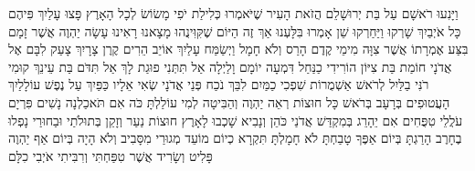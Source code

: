 \documentclass[../main/main.tex]{subfiles}
\begin{document}
\begin{multicols*}{\ncols}
וַיָּנִעוּ רֹאשָׁם עַל בַּת יְרוּשָׁלֵם הֲזֹאת הָעִיר שֶׁיֹּאמְרוּ כְּלִילַת יֹפִי מָשׂוֹשׂ לְכָל הָאָרֶץ \ClosedSection{}פָּצוּ עָלַיִךְ פִּיהֶם כָּל אֹיְבַיִךְ שָׁרְקוּ וַיַּחַרְקוּ שֵׁן אָמְרוּ בִּלָּעְנוּ אַךְ זֶה הַיּוֹם שֶׁקִּוִּינֻהוּ מָצָאנוּ רָאִינוּ \ClosedSection{}עָשָׂה יַהְוֶה אֲשֶׁר זָמָם בִּצַּע אֶמְרָתוֹ אֲשֶׁר צִוָּה מִימֵי קֶדֶם הָרַס וְלֹא חָמָל וַיְשַׂמַּח עָלַיִךְ אוֹיֵב הֵרִים קֶרֶן צָרָיִךְ \ClosedSection{}צָעַק לִבָּם אֶל אֲדֹנָי חוֹמַת בַּת צִיּוֹן הוֹרִידִי כַנַּחַל דִּמְעָה יוֹמָם וָלַיְלָה אַל תִּתְּנִי פוּגַת לָךְ אַל תִּדֹּם בַּת עֵינֵךְ \ClosedSection{}קוּמִי רֹנִּי בַלַּיִל לְרֹאשׁ אַשְׁמֻרוֹת שִׁפְכִי כַמַּיִם לִבֵּךְ נֹכַח פְּנֵי אֲדֹנָי שְׂאִי אֵלָיו כַּפַּיִךְ עַל נֶפֶשׁ עוֹלָלַיִךְ הָעֲטוּפִים בְּרָעָב בְּרֹאשׁ כָּל חוּצוֹת \ClosedSection{}רְאֵה יַהְוֶה וְהַבִּיטָה לְמִי עוֹלַלְתָּ כֹּה אִם תֹּאכַלְנָה נָשִׁים פִּרְיָם עֹלֲלֵי טִפֻּחִים אִם יֵהָרֵג בְּמִקְדַּשׁ אֲדֹנַי כֹּהֵן וְנָבִיא \ClosedSection{}שָׁכְבוּ לָאָרֶץ חוּצוֹת נַעַר וְזָקֵן בְּתוּלֹתַי וּבַחוּרַי נָפְלוּ בֶחָרֶב הָרַגְתָּ בְּיוֹם אַפֶּךָ טָבַחְתָּ לֹא חָמָלְתָּ \ClosedSection{}תִּקְרָא כְיוֹם מוֹעֵד מְגוּרַי מִסָּבִיב וְלֹא הָיָה בְּיוֹם אַף יַהְוֶה פָּלִיט וְשָׂרִיד אֲשֶׁר טִפַּחְתִּי וְרִבִּיתִי אֹיְבִי כִלָּם\OpenSection{}\par

\end{multicols*}
\end{document}
